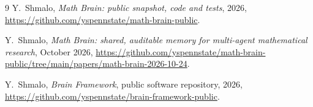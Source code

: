\documentclass[11pt]{amsart}
\theoremstyle{remark}
\begin{document}
\begin{thebibliography}{9}
 Y.~Shmalo, \emph{Math Brain: public snapshot, code and tests}, 2026, \url{https://github.com/yspennstate/math-brain-public}.

 Y.~Shmalo, \emph{Math Brain: shared, auditable memory for multi-agent mathematical research}, October 2026, \url{https://github.com/yspennstate/math-brain-public/tree/main/papers/math-brain-2026-10-24}.

 Y.~Shmalo, \emph{Brain Framework}, public software repository, 2026, \url{https://github.com/yspennstate/brain-framework-public}.

\end{thebibliography}
\end{document}
